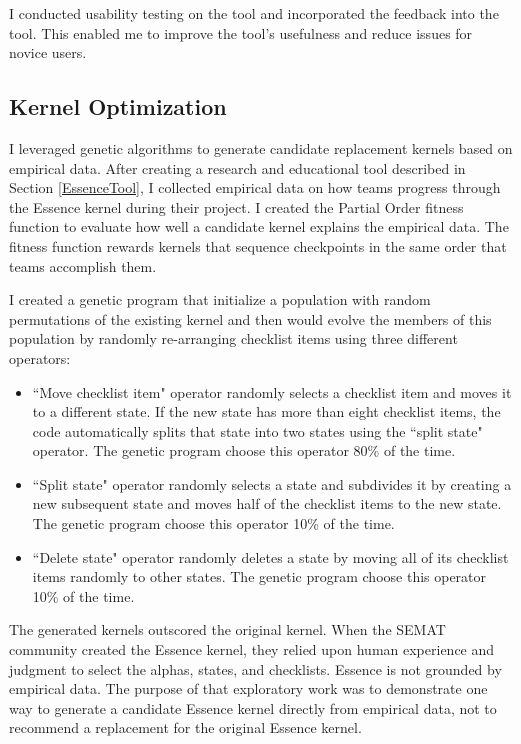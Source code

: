 \documentclass[preprint,12pt,3p]{elsarticle}
\begin{document}
I conducted usability testing on the tool and incorporated the feedback into the tool. This enabled me to improve the tool's usefulness and reduce issues for novice users. 

\subsection{Kernel Optimization}
\label{KernelOptimization}
I leveraged genetic algorithms to generate candidate replacement kernels based on empirical data. \cite{SCSE2015} After creating a research and educational tool described in Section \ref{EssenceTool}, I collected empirical data on how teams progress through the Essence kernel during their project. I created the Partial Order fitness function to evaluate how well a candidate kernel explains the empirical data. The fitness function rewards kernels that sequence checkpoints in the same order that teams accomplish them. 

I created a genetic program that initialize a population with random permutations of the existing kernel and then would evolve the members of this population by randomly re-arranging checklist items using three different operators:

\begin{itemize}
\item ``Move checklist item" operator randomly selects a checklist item and moves it to a different state. If the new state has more than eight checklist items, the code automatically splits that state into two states using the ``split state" operator. The genetic program choose this operator 80\% of the time.
\item ``Split state" operator randomly selects a state and subdivides it by creating a new subsequent state and moves half of the checklist items to the new state. The genetic program choose this operator 10\% of the time.
\item ``Delete state" operator randomly deletes a state by moving all of its checklist items randomly to other states. The genetic program choose this operator 10\% of the time.
\end{itemize}

The generated kernels outscored the original kernel. When the SEMAT community created the Essence kernel, they relied upon human experience and judgment to select the alphas, states, and checklists. Essence is not grounded by empirical data. The purpose of that exploratory work was to demonstrate one way to generate a candidate Essence kernel directly from empirical data, not to recommend a replacement for the original Essence kernel. 
\end{document}
